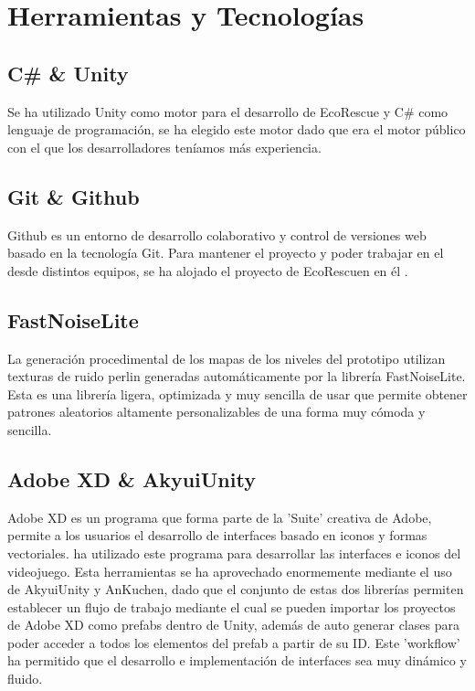 \section{Herramientas y Tecnologías}

\subsection{C\# \& Unity}

Se ha utilizado Unity\cite{unity} como motor para el desarrollo de EcoRescue y C\#\cite{csharp} como lenguaje de programación, se ha elegido este motor dado que era el motor público con el que los desarrolladores teníamos más experiencia.

\subsection{Git \& Github}

Github \cite{github} es un entorno de desarrollo colaborativo y control de versiones web basado en la tecnología Git. Para mantener el proyecto y poder trabajar en el desde distintos equipos, se ha alojado el proyecto de EcoRescuen en él \cite{Repo}.

\subsection{FastNoiseLite}

La generación procedimental de los mapas de los niveles del prototipo utilizan texturas de ruido perlin generadas automáticamente por la librería FastNoiseLite\cite{FastNoiseLite}. Esta es una librería ligera, optimizada y muy sencilla de usar que permite obtener patrones aleatorios altamente personalizables de una forma muy cómoda y sencilla.

\subsection{Adobe XD \& AkyuiUnity}

Adobe XD\cite{xd} es un programa que forma parte de la 'Suite' creativa de Adobe, permite a los usuarios el desarrollo de interfaces basado en iconos y formas vectoriales. \nombrecoautor ha utilizado este programa para desarrollar las interfaces e iconos del videojuego. Esta herramientas se ha aprovechado enormemente mediante el uso de AkyuiUnity\cite{AkyuiUnity} y AnKuchen\cite{AnKuchen}, dado que el conjunto de estas dos librerías permiten establecer un flujo de trabajo mediante el cual se pueden importar los proyectos de Adobe XD como prefabs dentro de Unity, además de auto generar clases para poder acceder a todos los elementos del prefab a partir de su ID. Este 'workflow' ha permitido que el desarrollo e implementación de interfaces sea muy dinámico y fluido. 

